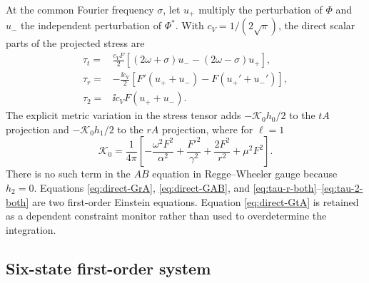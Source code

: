 At the common Fourier frequency $\sigma$, let $u_+$ multiply the perturbation
of $\Phi$ and $u_-$ the independent perturbation of $\Phi^*$.  With
$c_V=1/(2\sqrt\pi)$, the direct scalar parts of the projected stress are
\begin{align}
\tau_t={}&\frac{c_VF}{2}
\left[(2\omega+\sigma)u_--(2\omega-\sigma)u_+\right],
\label{eq:tau-t-both}\\
\tau_r={}&-\frac{\ii c_V}{2}
\left[F'(u_++u_-)-F(u_+'+u_-')\right],
\label{eq:tau-r-both}\\
\tau_2={}&\ii c_VF(u_++u_-).
\label{eq:tau-2-both}
\end{align}
The explicit metric variation in the stress tensor adds
$-\mathcal K_0h_0/2$ to the $tA$ projection and
$-\mathcal K_0h_1/2$ to the $rA$ projection, where for $\ell=1$
\begin{equation}
\mathcal K_0=\frac{1}{4\pi}\left[
-\frac{\omega^2F^2}{\alpha^2}+
\frac{F'^2}{\gamma^2}+\frac{2F^2}{r^2}+\mu^2F^2\right].
\label{eq:K0-axial}
\end{equation}
There is no such term in the $AB$ equation in Regge--Wheeler gauge because
$h_2=0$.  Equations \eqref{eq:direct-GrA}, \eqref{eq:direct-GAB}, and
\eqref{eq:tau-r-both}--\eqref{eq:tau-2-both} are two first-order Einstein
equations.  Equation \eqref{eq:direct-GtA} is retained as a dependent
constraint monitor rather than used to overdetermine the integration.

\subsection{Six-state first-order system}

